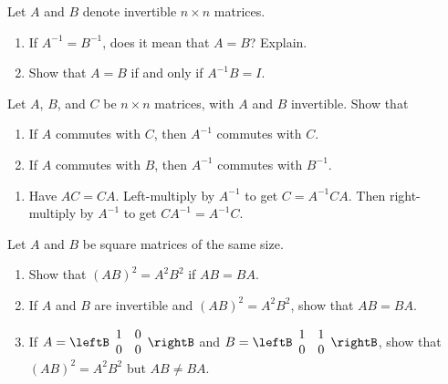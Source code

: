 \begin{multicols}{2}
\begin{ex}
\begin{sol}
\begin{enumerate}[label={\alph*.}]
\end{enumerate}
\end{sol}
\end{ex}

\begin{ex}
Let $A$ and $B$ denote invertible $n \times n$ matrices.


\begin{enumerate}[label={\alph*.}]
\item If $A^{-1} = B^{-1}$, does it mean that $A = B$? Explain.

\item Show that $A = B$ if and only if $A^{-1}B = I$.

\end{enumerate}
\end{ex}

\begin{ex}
Let $A$, $B$, and $C$ be $n \times n$ matrices, with $A$ and $B$ invertible. Show that


\begin{enumerate}[label={\alph*.}]
\item If $A$ commutes with $C$, then $A^{-1}$ commutes with $C$.

\item If $A$ commutes with $B$, then $A^{-1}$ commutes with $B^{-1}$.

\end{enumerate}
\begin{sol}
\begin{enumerate}[label={\alph*.}]
\item  Have $AC = CA$. Left-multiply by $A^{-1}$ to get $C = A^{-1}CA$. Then right-multiply by $A^{-1}$ to get $CA^{-1} = A^{-1}C$.

\end{enumerate}
\end{sol}
\end{ex}

\begin{ex}
Let $A$ and $B$ be square matrices of the same size.


\begin{enumerate}[label={\alph*.}]
\item Show that $(AB)^{2} = A^{2}B^{2}$ if $AB = BA$.

\item If $A$ and $B$ are invertible and $(AB)^{2} = A^{2}B^{2}$, show that $AB = BA$.

\item If $A = \leftB \begin{array}{rr}
1 & 0 \\
0 & 0
\end{array} \rightB$
 and $B = \leftB \begin{array}{rr}
 1 & 1 \\
 0 & 0
 \end{array} \rightB$, show that $(AB)^{2} = A^{2}B^{2}$ but $AB \neq BA$.


\end{enumerate}
\end{ex}
\end{multicols}
